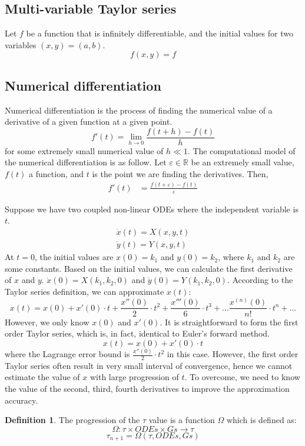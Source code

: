 \documentclass[twoside,a4paper,12pt]{article}
\theoremstyle{definition}
\newtheorem{definition}{Definition}
\begin{document}
\subsection{Multi-variable Taylor series}
Let $f$ be a function that is infinitely differentiable, and the initial values for two variables $(x,y) = (a,b)$.
\begin{equation}
	f(x,y) = f
\end{equation}


\subsection{Numerical differentiation}
Numerical differentiation is the process of finding the numerical value of a derivative of a given function at a given point.
\begin{equation}
f'(t) = \lim\limits_{h\rightarrow 0} \frac{f(t+h)-f(t)}{h}
\end{equation}
for some extremely small numerical value of $h \ll 1$.
The computational model of the numerical differentiation is as follow.
Let $\varepsilon \in \mathbb{R}$ be an extremely small value, $f(t)$ a function, and $t$ is the point we are finding the derivatives. Then,
\begin{align}
f'(t) &= \frac{f(t+\varepsilon)-f(t)}{\varepsilon}
\end{align}



Suppose we have two coupled non-linear ODEs where the independent variable is $t$.
\begin{gather}
	\dot{x}(t) = X(x,y,t) \\
	\dot{y}(t) = Y(x,y,t) 
\end{gather}
At $t=0$, the initial values are $x(0) = k_1$ and $y(0) = k_2$, where $k_1$ and $k_2$ are some constants.
Based on the initial values, we can calculate the first derivative of $x$ and $y$. $\dot{x}(0) = X(k_1, k_2, 0)$ and $\dot{y}(0) = Y(k_1, k_2, 0)$.
According to the Taylor series definition, we can approximate $x(t)$:
\begin{equation}
	x(t) = x(0) + x'(0) \cdot t + \frac{x''(0)}{2}\cdot t^2 + \frac{x'''(0)}{6}  \cdot t^3 + ... \frac{x^{(n)}(0)}{n!} \cdot t^n + ... 
\end{equation}
However, we only know $x(0)$ and $x'(0)$. It is straightforward to form the first order Taylor series, which is, in fact, identical to Euler's forward method.
\begin{equation}
	x(t) = x(0) + x'(0) \cdot t
\end{equation}
where the Lagrange error bound is $\frac{x''(0)}{2}\cdot t^2$ in this case.
However, the first order Taylor series often result in very small interval of convergence, hence we cannot estimate the value of $x$ with large progression of $t$.
To overcome, we need to know the value of the second, third, fourth derivatives to improve the approximation accuracy.









\begin{definition}
	The progression of the $\tau$ value is a function $\Omega$ which is defined as:
	\begin{equation}
			\Omega : \tau \times ODEs \times Gs \rightarrow \tau
	\end{equation}
	$$ \tau_{n+1} = \Omega(\tau, ODEs, Gs) $$
\end{definition}
\end{document}
